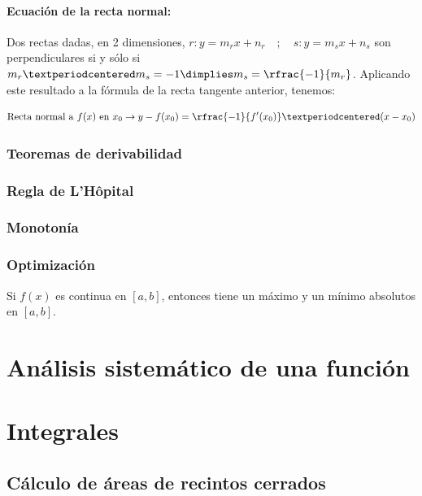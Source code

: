 \paragraph{Ecuación de la recta normal:} Dos rectas dadas, en 2 dimensiones, $r: y=m_rx+n_r\quad;\quad s:y=m_sx+n_s$ son perpendiculares si y sólo si $m_r·m_s = -1 \dimplies m_s = \rfrac{-1}{m_r}$.
%
Aplicando este resultado a la fórmula de la recta tangente anterior, tenemos:


\begin{mdframed}
	\begin{equation}
		\label{eq::rectatangente}
		\text{Recta normal a }f(x)\text{ en }x_0 \to y-f(x_0) = \rfrac{-1}{f'(x_0)}·(x-x_0)
	\end{equation}
\end{mdframed}


\subsubsection{Teoremas de derivabilidad}

\begin{theorem}

\end{theorem}


\begin{theorem}
\end{theorem}

\subsubsection{Regla de L'Hôpital}

\subsubsection{Monotonía}

\begin{theorem}
\end{theorem}
\begin{theorem}
\end{theorem}

\subsubsection{Optimización}


\begin{theorem}
Si $f(x)$ es continua en $[a,b]$, entonces tiene un máximo y un mínimo absolutos en $[a,b]$.
\end{theorem}


\section{Análisis sistemático de una función}

\section{Integrales}

\subsection{Cálculo de áreas de recintos cerrados}